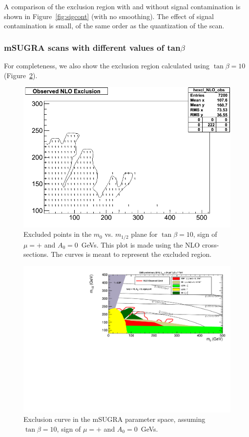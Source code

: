 A comparison of the exclusion region with and without
signal contamination is shown in Figure~\ref{fig:sigcont}
(with no smoothing).  The effect of signal contamination is 
small, of the same order as the quantization of the scan.


\subsubsection{mSUGRA scans with different values of tan$\beta$}
\label{sec:tanbetascan}

For completeness, we also show the exclusion region calculated
using $\tan\beta = 10$ (Figure~\ref{fig:msugratb10}).


\begin{figure}[tbh]
\begin{center}
\includegraphics[width=0.4\linewidth]{tanbeta10_NLO_observed.png}
\caption{\label{fig:tanbeta10raw}\protect Excluded points in the 
$m_0$ vs. $m_{1/2}$ plane for $\tan\beta=10$, sign of $\mu = +$ and $A_{0}=0$~GeVs. 
This plot is made using the NLO cross-sections.
The curves is meant to represent the excluded region.}
\end{center}
\end{figure}

\begin{figure}[tbh]
\begin{center}
\includegraphics[width=\linewidth]{exclusion_tanbeta10.pdf}
\caption{\label{fig:msugratb10}\protect Exclusion curve in the mSUGRA parameter space, 
assuming $\tan\beta=10$, sign of $\mu = +$ and $A_{0}=0$~GeVs.}  
\end{center}
\end{figure}






